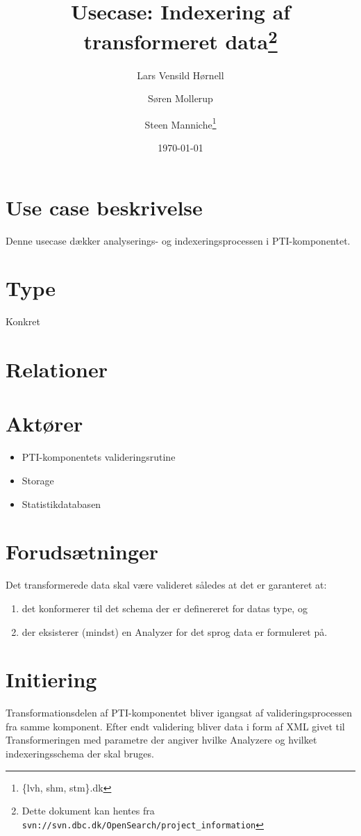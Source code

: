 \documentclass{article}
\author{Lars Vensild Hørnell \and Søren Mollerup \and Steen
  Manniche\thanks{\{lvh, shm, stm\}\@dbc.dk}}
\date{\today}
\title{Usecase: Indexering af transformeret data\thanks{Dette dokument kan hentes fra \texttt{svn://svn.dbc.dk/OpenSearch/project\_information}}}
\begin{document}
\maketitle

\newpage

\tableofcontents

\section{Use case beskrivelse}
Denne usecase dækker analyserings- og indexeringsprocessen i PTI-komponentet.

\section{Type}
Konkret

\section{Relationer}


\section{Aktører}
\begin{itemize}
\item PTI-komponentets valideringsrutine
\item Storage
\item Statistikdatabasen
\end{itemize}


\section{Forudsætninger}
Det transformerede data skal være valideret således at det er garanteret at:
\begin{enumerate}
\item det konformerer til det schema der er definereret for datas type, og
\item der eksisterer (mindst) en Analyzer for det sprog data er formuleret på.
\end{enumerate}

\section{Initiering}
Transformationsdelen af PTI-komponentet bliver igangsat af
valideringsprocessen fra samme komponent. Efter endt validering bliver
data i form af XML givet til Transformeringen med parametre der
angiver hvilke Analyzere og hvilket indexeringsschema der skal bruges.
\end{document}
